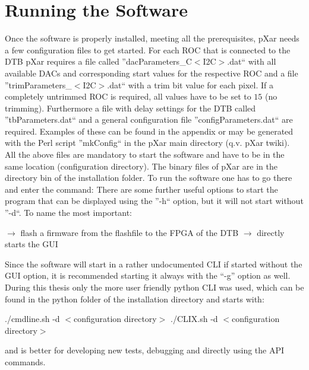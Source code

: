 \section{Running the Software}\label{srunpx}
Once the software is properly installed, meeting all the prerequisites, pXar needs a few configuration files to get started. For each \ac{ROC} that is connected to the \ac{DTB} pXar requires a file called ''dacParameters\_C$<$\ac{I2C}$>$.dat`` with all available \ac{DAC}s and corresponding start values for the respective \ac{ROC} and a file ''trimParameters\_$<$\ac{I2C}$>$.dat`` with a trim bit value for each pixel. If a completely untrimmed \ac{ROC} is required, all values have to be set to $15$ (no trimming). Furthermore a file with delay settings for the \ac{DTB} called ''tbParameters.dat`` and a general configuration file ''configParameters.dat`` are required. Examples of these can be found in the appendix  or may be generated with the Perl script ''mkConfig`` in the pXar main directory (q.v. pXar twiki).\\
All the above files are mandatory to start the software and have to be in the same location (configuration directory). The binary files of pXar are in the directory bin of the installation folder. To run the software one has to go there and enter the command:
There are some further useful options to start the program that can be displayed using the ''-h`` option, but it will not start without ''-d``. To name the most important:
\begin{itemize}
	 \ka $\rightarrow$ flash a firmware from the flashfile to the \ac{FPGA} of the \ac{DTB}
	 \ka $\rightarrow$ directly starts the \ac{GUI}
\end{itemize}
Since the software will start in a rather undocumented \ac{CLI} if started without the \ac{GUI} option, it is recommended starting it always with the ``-g'' option as well.\\
During this thesis only the more user friendly python \ac{CLI} was used, which can be found in the python folder of the installation directory and starts with:
\begin{itemize}\ubuntu
	\tri ./cmdline.sh -d $<$configuration directory$>$
	\tri ./CLIX.sh -d $<$configuration directory$>$
\end{itemize}
and is better for developing new tests, debugging and directly using the \ac{API} commands.
